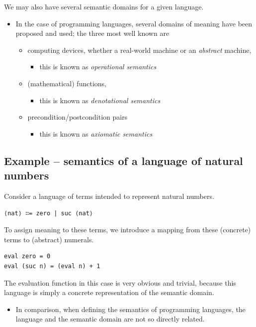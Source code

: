 \documentclass[11pt]{article}
\theoremstyle{definition}
\begin{document}
We may also have several semantic domains for a given language.
\begin{itemize}
\item In the case of programming languages,
several domains of meaning have been proposed and used;
the three most well known are
\begin{itemize}
\item computing devices, whether a real-world machine or an \emph{abstract} machine,
\begin{itemize}
\item this is known as \emph{operational semantics}
\end{itemize}
\item (mathematical) functions,
\begin{itemize}
\item this is known as \emph{denotational semantics}
\end{itemize}
\item precondition/postcondition pairs
\begin{itemize}
\item this is known as \emph{axiomatic semantics}
\end{itemize}
\end{itemize}
\end{itemize}

\subsection{Example – semantics of a language of natural numbers}
\label{sec:orgf932e15}
Consider a language of terms intended to represent
natural numbers.
\begin{verbatim}
⟨nat⟩ ∷= zero | suc ⟨nat⟩ 
\end{verbatim}

To assign meaning to these terms,
we introduce a mapping from these (concrete) terms
to (abstract) numerals.
\begin{verbatim}
eval zero = 0
eval (suc n) = (eval n) + 1
\end{verbatim}

The evaluation function in this case is very obvious and trivial,
because this language is simply a concrete representation
of the semantic domain.
\begin{itemize}
\item In comparison, when defining the semantics of programming languages,
the language and the semantic domain are not so directly related.
\end{itemize}
\end{document}
